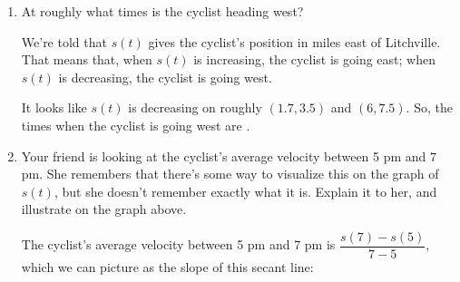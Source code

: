 \documentclass{article}
\theoremstyle{theorem}
\begin{document}
\begin{enumerate}
  \begin{center}
  \end{center}

  \begin{enumerate}
  \item
    \begin{problem}[\vfill]
      At roughly what times is the cyclist heading west? 
    \end{problem}

    \begin{solution}
      We're told that $s(t)$ gives the cyclist's position in miles east of Litchville. That means that, when $s(t)$ is increasing, the cyclist is going east; when $s(t)$ is decreasing, the cyclist is going west.

      It looks like $s(t)$ is decreasing on roughly $(1.7, 3.5)$ and $(6, 7.5)$. So, the times when the cyclist is going west are . 
    \end{solution}

  \item
    \begin{problem}[\vfill]
      Your friend is looking at the cyclist's average velocity between 5 pm and 7 pm. She remembers that there's some way to visualize this on the graph of $s(t)$, but she doesn't remember exactly what it is. Explain it to her, and illustrate on the graph above. 
    \end{problem}

    \begin{solution}
      The cyclist's average velocity between 5 pm and 7 pm is $\dfrac{s(7) - s(5)}{7 - 5}$, which we can picture as the slope of this secant line:
      \begin{center}
      \end{center}      
    \end{solution}


\end{enumerate}
\end{enumerate}
\end{document}
